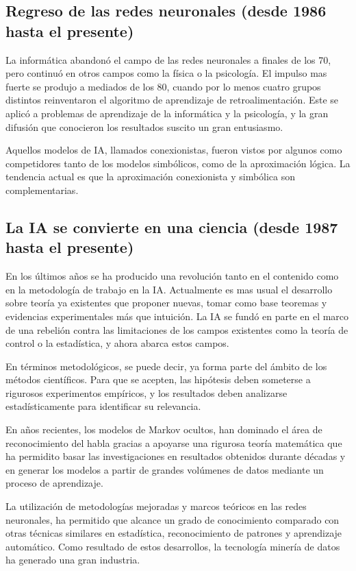 \documentclass[12pt,a4paper]{article}
\begin{document}
\subsection{Regreso de las redes neuronales (desde 1986 hasta el presente)}
La informática abandonó el campo de las redes neuronales a finales de los 70, pero continuó en otros campos como la física o la psicología. El impulso mas fuerte se produjo a mediados de los 80, cuando por lo menos cuatro grupos distintos reinventaron el algoritmo de aprendizaje de retroalimentación. Este se aplicó a problemas de aprendizaje de la informática y la psicología, y la gran difusión que conocieron los resultados suscito un gran entusiasmo.

Aquellos modelos de IA, llamados conexionistas, fueron vistos por algunos como competidores tanto de los modelos simbólicos, como de la aproximación lógica. La tendencia actual es que la aproximación conexionista y simbólica son complementarias.

\subsection{La IA se convierte en una ciencia (desde 1987 hasta el presente)}
En los últimos años se ha producido una revolución tanto en el contenido como en la metodología de trabajo en la IA. Actualmente es mas usual el desarrollo sobre teoría ya existentes que proponer nuevas, tomar como base teoremas y evidencias experimentales más que intuición. La IA se fundó en parte en el marco de una rebelión contra las limitaciones de los campos existentes como la teoría de control o la estadística, y ahora abarca estos campos.

En términos metodológicos, se puede decir, ya forma parte del ámbito de los métodos científicos. Para que se acepten, las hipótesis deben someterse a rigurosos experimentos empíricos, y los resultados deben analizarse estadísticamente para identificar su relevancia.

En años recientes, los modelos de Markov ocultos, han dominado el área de reconocimiento del habla gracias a apoyarse una rigurosa teoría matemática que ha permidito basar las investigaciones en resultados obtenidos durante décadas y en generar los modelos a partir de grandes volúmenes de datos mediante un proceso de aprendizaje.

La utilización de metodologías mejoradas y marcos teóricos en las redes neuronales, ha permitido que alcance un grado de conocimiento comparado con otras técnicas similares en estadística, reconocimiento de patrones y aprendizaje automático. Como resultado de estos desarrollos, la tecnología minería de datos ha generado una gran industria.
\end{document}
